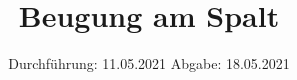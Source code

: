 

\subject{406}
\title{Beugung am Spalt}
\date{%
  Durchführung: 11.05.2021
  \hspace{3em}
  Abgabe: 18.05.2021
}



\maketitle
\thispagestyle{empty}
\tableofcontents
\newpage







\printbibliography{}



